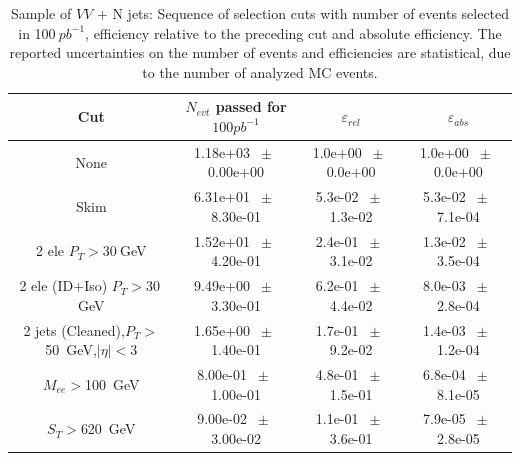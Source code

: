 \begin{table}[htbp] 
\begin{center} 
\begin{tabular}{|c|c|c|c|} 
\hline\hline 
 Cut & $N_{evt}$ passed for $100pb^{-1}$ & $\varepsilon_{rel}$ & $\varepsilon_{abs}$ \\ 
\hline\hline 
None       &        1.18e+03       $~\pm~$       0.00e+00        &        1.0e+00       $~\pm~$       0.0e+00        &        1.0e+00       $~\pm~$       0.0e+00       \\       
       Skim       &        6.31e+01       $~\pm~$       8.30e-01        &        5.3e-02       $~\pm~$       1.3e-02        &        5.3e-02       $~\pm~$       7.1e-04       \\       
       2 ele $P_T>30~$GeV       &        1.52e+01       $~\pm~$       4.20e-01        &        2.4e-01       $~\pm~$       3.1e-02        &        1.3e-02       $~\pm~$       3.5e-04       \\       
       2 ele (ID+Iso) $P_T>30~$GeV       &        9.49e+00       $~\pm~$       3.30e-01        &        6.2e-01       $~\pm~$       4.4e-02        &        8.0e-03       $~\pm~$       2.8e-04       \\       
       2 jets (Cleaned),$P_T>$50~GeV,$|\eta|<$3       &        1.65e+00       $~\pm~$       1.40e-01        &        1.7e-01       $~\pm~$       9.2e-02        &        1.4e-03       $~\pm~$       1.2e-04       \\       
       $M_{ee}>$100~GeV       &        8.00e-01       $~\pm~$       1.00e-01        &        4.8e-01       $~\pm~$       1.5e-01        &        6.8e-04       $~\pm~$       8.1e-05       \\       
       $S_T>$620~GeV       &        9.00e-02       $~\pm~$       3.00e-02        &        1.1e-01       $~\pm~$       3.6e-01        &        7.9e-05       $~\pm~$       2.8e-05       \\       
          \hline\hline 
\end{tabular} 
\end{center} 
\caption{Sample of $VV$ + N jets: Sequence of selection cuts with number of events selected in 100$~pb^{-1}$, efficiency relative to the preceding cut and absolute efficiency.  The reported uncertainties on the number of events and efficiencies are statistical, due to the number of analyzed MC events.} 
\label{tab:effic-VV} 
\end{table} 

